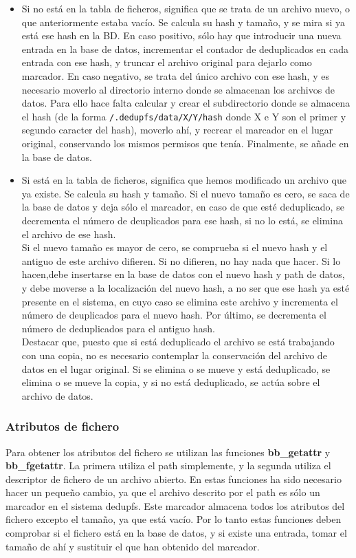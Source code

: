 \documentclass[12pt,a4paper]{article}
\begin{document}
\begin{itemize}
 \item Si no está en la tabla de ficheros, significa que se trata de un archivo nuevo, o que anteriormente estaba vacío. Se calcula su hash y tamaño, y se mira si ya está ese hash en la BD. En caso positivo, sólo hay que introducir una nueva entrada en la base de datos, incrementar el contador de deduplicados en cada entrada con ese hash, y truncar el archivo original para dejarlo como marcador. En caso negativo, se trata del único archivo con ese hash, y es necesario moverlo al directorio interno donde se almacenan los archivos de datos. Para ello hace falta calcular y crear el subdirectorio donde se almacena el hash (de la forma \texttt{\small /.dedupfs/data/X/Y/hash} donde X e Y son el primer y segundo caracter del hash), moverlo ahí, y recrear el marcador en el lugar original, conservando los mismos permisos que tenía. Finalmente, se añade en la base de datos.
 \item Si está en la tabla de ficheros, significa que hemos modificado un archivo que ya existe. Se calcula su hash y tamaño. Si el nuevo tamaño es cero, se saca de la base de datos y deja sólo el marcador, en caso de que esté deduplicado, se decrementa el número de deuplicados para ese hash, si no lo está, se elimina el archivo de ese hash.\\
 Si el nuevo tamaño es mayor de cero, se comprueba si el nuevo hash y el antiguo de este archivo difieren. Si no difieren, no hay nada que hacer. Si lo hacen,debe insertarse en la base de datos con el nuevo hash y path de datos, y debe moverse a la localización del nuevo hash, a no ser que ese hash ya esté presente en el sistema, en cuyo caso se elimina este archivo y incrementa el número de deuplicados para el nuevo hash. Por último, se decrementa el número de deduplicados para el antiguo hash.\\
 Destacar que, puesto que si está deduplicado el archivo se está trabajando con una copia, no es necesario contemplar la conservación del archivo de datos en el lugar original. Si se elimina o se mueve y está deduplicado, se elimina o se mueve la copia, y si no está deduplicado, se actúa sobre el archivo de datos.
\end{itemize}

\subsubsection{Atributos de fichero}

Para obtener los atributos del fichero se utilizan las funciones \textbf{bb\_getattr} y \textbf{bb\_fgetattr}. La primera utiliza el path simplemente, y la segunda utiliza el descriptor de fichero de un archivo abierto. En estas funciones ha sido necesario hacer un pequeño cambio, ya que el archivo descrito por el path es sólo un marcador en el sistema dedupfs. Este marcador almacena todos los atributos del fichero excepto el tamaño, ya que está vacío. Por lo tanto estas funciones deben comprobar si el fichero está en la base de datos, y si existe una entrada, tomar el tamaño de ahí y sustituir el que han obtenido del marcador.
\end{document}
